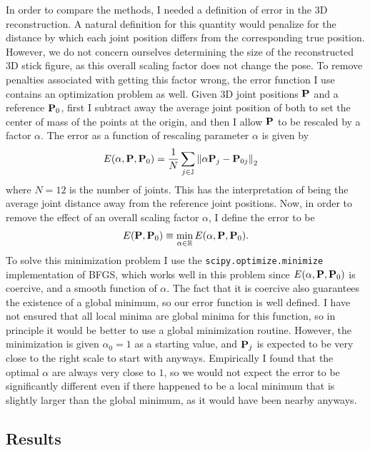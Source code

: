 \documentclass[final]{article}
\newcommand{\code}[1]{\texttt{#1}}
\begin{document}
\begin{spacing}{1.1}
In order to compare the methods, I needed a definition of error in the 3D reconstruction. A natural definition for this quantity would penalize for the distance by which each joint position differs from the corresponding true position. However, we do not concern ourselves determining the size of the reconstructed 3D stick figure, as this overall scaling factor does not change the pose. To remove penalties associated with getting this factor wrong, the error function I use contains an optimization problem as well. Given 3D joint positions $\vb{P}$ and a reference $\vb{P}_0$, first I subtract away the average joint position of both to set the center of mass of the points at the origin, and then I allow $\vb{P}$ to be rescaled by a factor $\alpha$. The error as a function of rescaling parameter $\alpha$ is given by
\begin{align}
  E(\alpha,\vb{P},\vb{P}_0) &= \frac{1}{N} \sum_{j\in \mathbb{J}} \norm{\alpha\vb{P}_j - \vb{P}_{0j}}_2
  \label{eq:erroralpha}
\end{align}
where $N = 12$ is the number of joints. This has the interpretation of being the average joint distance away from the reference joint positions. Now, in order to remove the effect of an overall scaling factor $\alpha$, I define the error to be
\begin{align}
  E(\vb{P},\vb{P}_0) \equiv \min_{\alpha \in \mathbb{R}} E\qty(\alpha,\vb{P},\vb{P}_0).
  \label{eq:error}
\end{align}
To solve this minimization problem I use the \code{scipy.optimize.minimize} implementation of BFGS, which works well in this problem since $E(\alpha,\vb{P},\vb{P}_0)$ is coercive, and a smooth function of $\alpha$. The fact that it is coercive also guarantees the existence of a global minimum, so our error function is well defined. I have not ensured that all local minima are global minima for this function, so in principle it would be better to use a global minimization routine. However, the minimization is given $\alpha_0 = 1$ as a starting value, and $\vb{P}_j$ is expected to be very close to the right scale to start with anyways. Empirically I found that the optimal $\alpha$ are always very close to $1$, so we would not expect the error to be significantly different even if there happened to be a local minimum that is slightly larger than the global minimum, as it would have been nearby anyways.


\subsection{Results}


\end{spacing}
\end{document}
